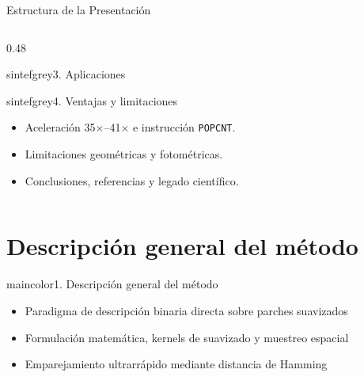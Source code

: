 \documentclass{beamer}
\begin{document}
\begin{frame}{Estructura de la Presentación}
\begin{columns}[T]
\begin{column}{0.48\textwidth}
\begin{colorblock}[black]{sintefgrey}{3. Aplicaciones}
\begin{itemize}
\end{itemize}
\end{colorblock}
\vspace{0.15cm}
\begin{colorblock}[black]{sintefgrey}{4. Ventajas y limitaciones}
\scriptsize
\begin{itemize}\setlength{\itemsep}{2pt}
    \item Aceleración 35$\times$--41$\times$ e instrucción \texttt{POPCNT}.
    \item Limitaciones geométricas y fotométricas.
    \item Conclusiones, referencias y legado científico.
\end{itemize}
\end{colorblock}
\end{column}
\end{columns}
\end{frame}

\section{Descripción general del método}

\begin{chapter}{maincolor}{1. Descripción general del método}
\footnotesize
\begin{itemize}
    \item Paradigma de descripción binaria directa sobre parches suavizados
    \item Formulación matemática, kernels de suavizado y muestreo espacial
    \item Emparejamiento ultrarrápido mediante distancia de Hamming
\end{itemize}
\end{chapter}

\end{document}
